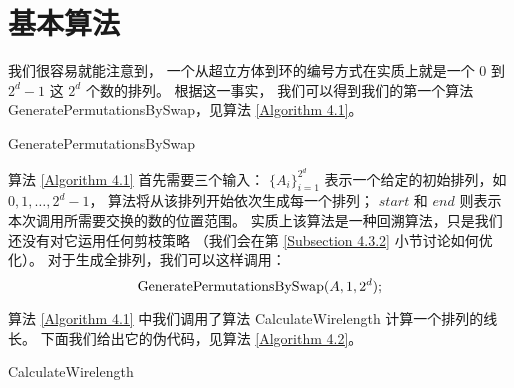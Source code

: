 \section{基本算法}
\label{Section 4.2}

我们很容易就能注意到，
一个从超立方体到环的编号方式在实质上就是一个 $0$ 到 $2^d - 1$ 这 $2^d$ 个数的排列。
根据这一事实，
我们可以得到我们的第一个算法 GeneratePermutationsBySwap，见算法 \ref{Algorithm 4.1}。

\begin{algorithm}[h!]
\caption{GeneratePermutationsBySwap}
\label{Algorithm 4.1}
\begin{algorithmic}[1]
	 
	 

		 
			 
		\EndIf
	\Else
			 
		\EndFor
	\EndIf
\end{algorithmic}
\end{algorithm}

算法 \ref{Algorithm 4.1} 首先需要三个输入：
$\{A_i\}_{i = 1}^{2^d}$ 表示一个给定的初始排列，如 $0, 1, \dots, 2^d - 1$，
算法将从该排列开始依次生成每一个排列；
$start$ 和 $end$ 则表示本次调用所需要交换的数的位置范围。
实质上该算法是一种回溯算法，只是我们还没有对它运用任何剪枝策略
（我们会在第 \ref{Subsection 4.3.2} 小节讨论如何优化）。
对于生成全排列，我们可以这样调用：
\begin{equation*}
\textnormal{GeneratePermutationsBySwap}(A, 1, 2^d);
\end{equation*}

算法 \ref{Algorithm 4.1} 中我们调用了算法 CalculateWirelength 计算一个排列的线长。
下面我们给出它的伪代码，见算法 \ref{Algorithm 4.2}。

\begin{algorithm}[h!]
\caption{CalculateWirelength}
\label{Algorithm 4.2}
\begin{algorithmic}[1]
	 
	 

			 
				\Else
				\EndIf
			\EndIf
		\EndFor
	\EndFor
\end{algorithmic}
\end{algorithm}

